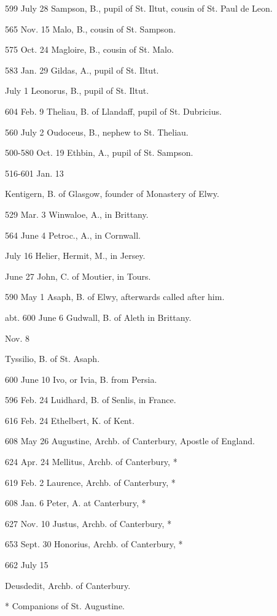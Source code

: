 599 July
28
Sampson, B., pupil of St. Iltut, cousin of St. Paul de Leon.

565 Nov.
15
Malo, B., cousin of St. Sampson.

575 Oct.
24
Magloire, B., cousin of St. Malo.

583 Jan.
29
Gildas, A., pupil of St. Iltut.

July 1
Leonorus, B., pupil of St. Iltut.

604 Feb.
9
Theliau, B. of Llandaff, pupil of St. Dubricius.

560 July
2
Oudoceus, B., nephew to St. Theliau.

500-580 Oct.
19
Ethbin,
A., pupil of St. Sampson.

516-601 Jan.
13

Kentigern,
B. of Glasgow, founder of Monastery of Elwy.


529 Mar.
3
Winwaloe,
A., in Brittany.

564 June
4
Petroc., A., in Cornwall.

July 16
Helier,
Hermit, M., in Jersey.

June 27
John,
C. of Moutier, in Tours.

590 May
1
Asaph, B. of Elwy, afterwards called after him.

abt. 600 June
6
Gudwall,
B. of Aleth in Brittany.

Nov. 8

Tyssilio, B. of St. Asaph.


600 June
10
Ivo,
or Ivia, B. from Persia.

596 Feb.
24
Luidhard, B. of Senlis, in France.

616 Feb.
24
Ethelbert, K. of Kent.

608 May
26
Augustine, Archb. of Canterbury, Apostle of England.

624 Apr.
24
Mellitus, Archb. of Canterbury, *

619 Feb.
2
Laurence, Archb. of Canterbury, *

608 Jan.
6
Peter, A. at Canterbury, *

627 Nov.
10
Justus, Archb. of Canterbury, *

653 Sept.
30
Honorius, Archb. of Canterbury, *

662 July
15

Deusdedit, Archb. of Canterbury.

* Companions of St. Augustine.

